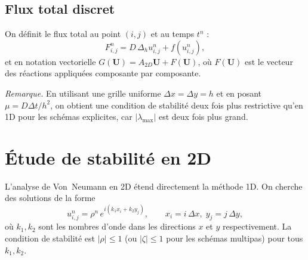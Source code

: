 \documentclass[11pt,a4paper]{report}
\begin{document}
\subsection*{Flux total discret}

On d\'efinit le flux total au point $(i,j)$ et au temps $t^n$ :
\begin{equation}
  F_{i,j}^n = D\,\Delta_h u_{i,j}^n + f(u_{i,j}^n),
\end{equation}
et en notation vectorielle $G(\mathbf{U}) = A_{2D}\mathbf{U} + F(\mathbf{U})$,
o\`u $F(\mathbf{U})$ est le vecteur des r\'eactions appliqu\'ees composante par composante.

\medskip
\noindent\textit{Remarque.} En utilisant une grille uniforme $\Delta x=\Delta y=h$ et en
posant $\mu = D\Delta t/h^2$, on obtient une condition de stabilit\'e deux fois plus
restrictive qu'en 1D pour les sch\'emas explicites, car $|\lambda_{\max}|$ est
deux fois plus grand.



\section{ \'Etude de stabilit\'e en 2D}

L'analyse de Von~Neumann en 2D \'etend directement la m\'ethode 1D. On cherche des solutions
de la forme
\begin{equation}
  u_{i,j}^n = \rho^n \, e^{i(k_1 x_i + k_2 y_j)},
  \qquad x_i=i\,\Delta x,\; y_j=j\,\Delta y,
\end{equation}
o\`u $k_1,k_2$ sont les nombres d'onde dans les directions $x$ et $y$ respectivement.
La condition de stabilit\'e est $|\rho|\le 1$ (ou $|\zeta|\le 1$ pour les sch\'emas multipas)
pour tous $k_1,k_2$.
\end{document}

